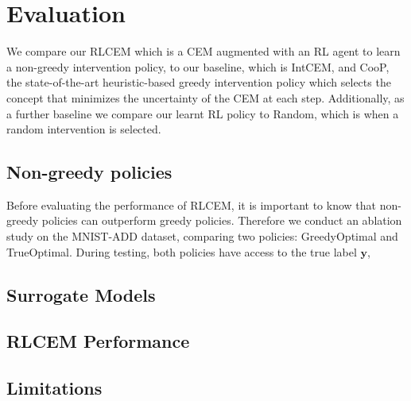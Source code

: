 \documentclass[../main.tex]{subfiles}
\begin{document}
\chapter{Evaluation}

We compare our RLCEM which is a CEM augmented with an RL agent to learn 
a non-greedy intervention policy, to our baseline, which is IntCEM, and CooP,
the state-of-the-art heuristic-based greedy intervention policy which 
selects the concept that minimizes the uncertainty of the CEM at each step. Additionally,
as a further baseline we compare our learnt RL policy to Random,
which is when a random intervention is selected.

\section{Non-greedy policies}

Before evaluating the performance of RLCEM, it is important to know that 
non-greedy policies can outperform greedy policies. Therefore we conduct an
ablation study on the MNIST-ADD dataset, comparing two policies:
GreedyOptimal and TrueOptimal.
During testing, both policies have access to the true label
$\mathbf{y}$, 

\section{Surrogate Models}

\section{RLCEM Performance}

\section{Limitations}
\end{document}
